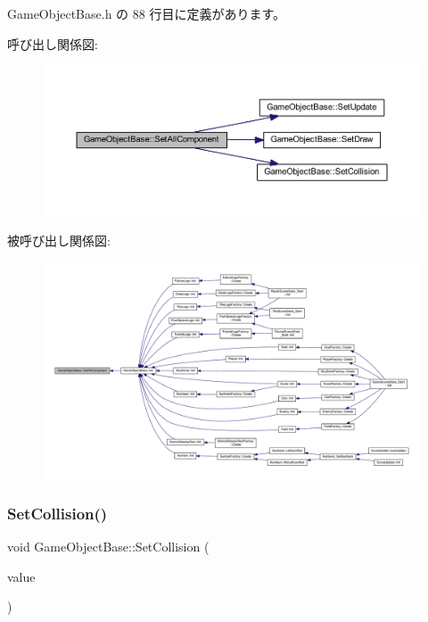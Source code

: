  Game\+Object\+Base.\+h の 88 行目に定義があります。

呼び出し関係図\+:\nopagebreak
\begin{figure}[H]
\begin{center}
\leavevmode
\includegraphics[width=350pt]{class_game_object_base_aad0e581dfba83d11af6412a0df6ecd90_cgraph}
\end{center}
\end{figure}
被呼び出し関係図\+:\nopagebreak
\begin{figure}[H]
\begin{center}
\leavevmode
\includegraphics[width=350pt]{class_game_object_base_aad0e581dfba83d11af6412a0df6ecd90_icgraph}
\end{center}
\end{figure}
\mbox{\label{class_game_object_base_a4aeb0212f5a390570d050bfef51b7818}} 
\subsubsection{\texorpdfstring{Set\+Collision()}{SetCollision()}}
{\footnotesize\ttfamily void Game\+Object\+Base\+::\+Set\+Collision (\begin{DoxyParamCaption}\item[{\mbox{\hyperlink{class_collision_base}{Collision\+Base}} $\ast$}]{value }\end{DoxyParamCaption})\hspace{0.3cm}{\ttfamily [inline]}}



